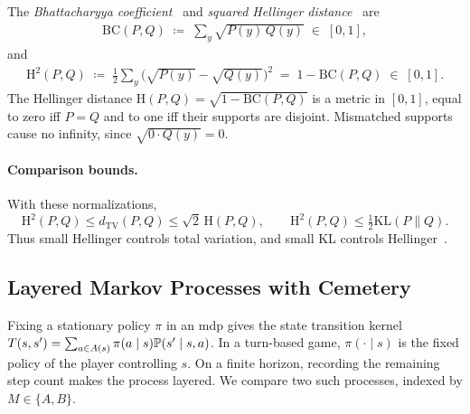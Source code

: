 \begin{definition}
The \emph{Bhattacharyya coefficient}~\parencite{Bhattacharyya1943} and \emph{squared Hellinger distance}~\parencite{Hellinger1909} are
\begin{align}\label{ptnb:eq:bc-def}
    \mathrm{BC}(P, Q) \;\coloneqq\; \sum_{y} \sqrt{P(y)\, Q(y)} \;\in\; [0, 1],
\end{align}
and
\begin{align}\label{ptnb:eq:hellinger-def}
    \mathrm{H}^2(P, Q) \;\coloneqq\; \tfrac{1}{2} \sum_y \bigl(\sqrt{P(y)} - \sqrt{Q(y)}\bigr)^2 \;=\;
    1 - \mathrm{BC}(P, Q) \;\in\; [0, 1].
\end{align}
The Hellinger distance $\mathrm H(P,Q)=\sqrt{1-\mathrm{BC}(P,Q)}$ is a metric in $[0,1]$, equal to zero iff $P=Q$ and to one iff their supports are disjoint. Mismatched supports cause no infinity, since $\sqrt{0\cdot Q(y)}=0$.
\end{definition}

\paragraph{Comparison bounds.}\label{ptnb:sec:lmp-hellinger-distance}\label{subsec:hellinger_definition}\label{ptnb:app:why-hellinger}
With these normalizations,
\[
 \mathrm H^2(P,Q)\le d_{\mathrm{TV}}(P,Q)\le\sqrt2\,\mathrm H(P,Q),
 \qquad \mathrm H^2(P,Q)\le\tfrac12\mathrm{KL}(P\|Q).
\]
Thus small Hellinger controls total variation, and small KL controls Hellinger~\parencite[Sections~7.3 and~7.6]{PolyanskiyWu2025InformationTheory}.


\subsection{Layered Markov Processes with Cemetery}\label{ptnb:sec:lmp-foundations}\label{subsec:trajectory_measures}\label{ptnb:sec:lmp}

Fixing a stationary policy $\pi$ in an \ac{mdp} gives the state transition kernel $T(s,s')=\sum_{a\in A(s)}\pi(a\mid s)\P(s'\mid s,a)$. In a turn-based game, $\pi(\cdot\mid s)$ is the fixed policy of the player controlling $s$. On a finite horizon, recording the remaining step count makes the process layered. We compare two such processes, indexed by $M\in\{A,B\}$.

